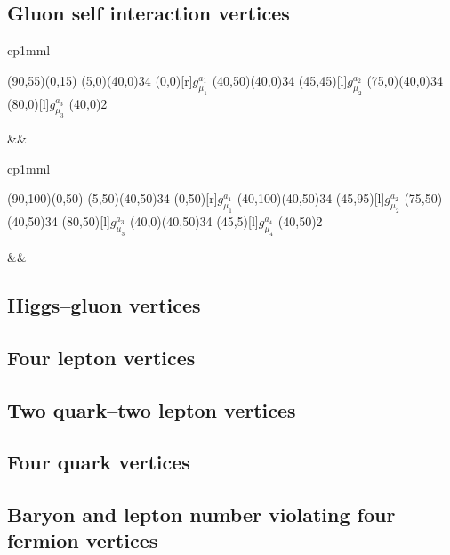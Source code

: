 \documentclass[11pt]{article}
\begin{document}
\bigskip

\bigskip
\bigskip
\subsection{Gluon self interaction vertices}

\noindent \begin{tabular}{cp{1mm}l}
\begin{picture}(90,55)(0,15)
\Gluon(5,0)(40,0){3}{4}
\Text(0,0)[r]{$g^{a_1}_{\mu_1}$}
\Gluon(40,50)(40,0){3}{4}
\Text(45,45)[l]{$g^{a_2}_{\mu_2}$}
\Gluon(75,0)(40,0){3}{4}
\Text(80,0)[l]{$g^{a_3}_{\mu_3}$}
\Vertex(40,0){2}
\end{picture}
&&
\begin{minipage}[c]{0.8\linewidth}

\end{minipage}
\end{tabular}

\bigskip

\noindent \begin{tabular}{cp{1mm}l}
\begin{picture}(90,100)(0,50)
\Gluon(5,50)(40,50){3}{4}
\Text(0,50)[r]{$g^{a_1}_{\mu_1}$}
\Gluon(40,100)(40,50){3}{4}
\Text(45,95)[l]{$g^{a_2}_{\mu_2}$}
\Gluon(75,50)(40,50){3}{4}
\Text(80,50)[l]{$g^{a_3}_{\mu_3}$}
\Gluon(40,0)(40,50){3}{4}
\Text(45,5)[l]{$g^{a_4}_{\mu_4}$}
\Vertex(40,50){2}
\end{picture}
&&
\begin{minipage}[c]{0.8\linewidth}

\end{minipage}
\end{tabular}

\bigskip

\bigskip
\bigskip
\subsection{Higgs--gluon vertices}

\bigskip
\bigskip
\subsection{Four
lepton vertices}

\bigskip
\bigskip
\subsection{Two quark--two lepton vertices}

\bigskip
\bigskip
\subsection{Four quark vertices}

\bigskip
\bigskip
\subsection{Baryon and lepton
number violating four fermion vertices}
\end{document}
